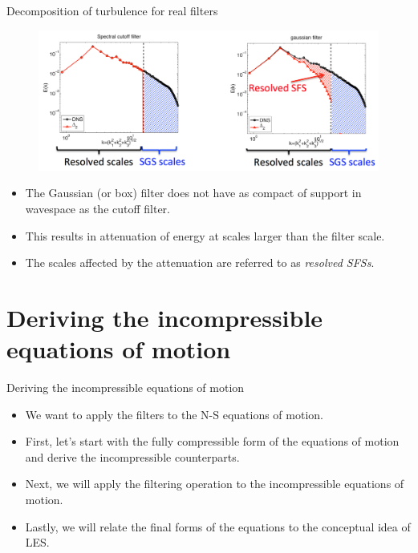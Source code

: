 \begin{frame}{Decomposition of turbulence for real filters}
\begin{figure}
	\includegraphics[width=1\textwidth]{filter_decomp.png}
\end{figure}
\begin{itemize}
	\item The Gaussian (or box) filter does not have as compact of support in wavespace as the cutoff filter.
	\item This results in attenuation of energy at scales larger than the filter scale.
	\item The scales affected by the attenuation are referred to as \textit{resolved SFSs}.
\end{itemize}
\end{frame}

\section{Deriving the incompressible equations of motion} %
\begin{frame}{Deriving the incompressible equations of motion}

\begin{itemize}
	\item We want to apply the filters to the N-S equations of motion.
	\item First, let's start with the fully compressible form of the equations of motion and derive the incompressible counterparts.
	\item Next, we will apply the filtering operation to the incompressible equations of motion.
	\item Lastly, we will relate the final forms of the equations to the conceptual idea of LES.
\end{itemize}
\end{frame}

